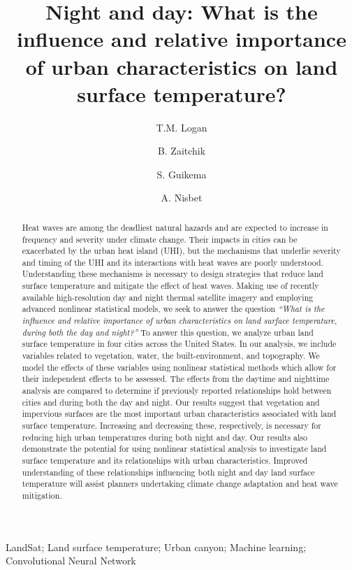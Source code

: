 \documentclass[final,3p,times,twocolumn,sort&compress]{elsarticle}
\begin{document}
\begin{frontmatter}

\title{Night and day: What is the influence and relative importance of urban characteristics on land surface temperature?}

\author[1]{T.M. Logan}

\author[2]{B. Zaitchik}
\author[1]{S. Guikema}
\author[]{A. Nisbet}

\address[1]{Industrial and Operations Engineering, University of Michigan, Ann Arbor, MI}
\address[2]{Earth and Planetary Sciences, Johns Hopkins University, Baltimore, MD}

\begin{abstract}
Heat waves are among the deadliest natural hazards and are expected to increase in frequency and severity under climate change. 
Their impacts in cities can be exacerbated by the urban heat island (UHI), but the mechanisms that underlie severity and timing of the UHI and its interactions with heat waves are poorly understood.
Understanding these mechanisms is necessary to design strategies that reduce land surface temperature and mitigate the effect of heat waves.
Making use of recently available high-resolution day and night thermal satellite imagery and employing advanced nonlinear statistical models, we seek to answer the question \textit{``What is the influence and relative importance of urban characteristics on land surface temperature, during both the day and night?''} 
To answer this question, we analyze urban land surface temperature in four cities across the United States.
In our analysis, we include variables related to vegetation, water, the built-environment, and topography. 
We model the effects of these variables using nonlinear statistical methods which allow for their independent effects to be assessed.
The effects from the daytime and nighttime analysis are compared to determine if previously reported relationships hold between cities and during both the day and night.
Our results suggest that vegetation and impervious surfaces are the most important urban characteristics associated with land surface temperature.
Increasing and decreasing these, respectively, is necessary for reducing high urban temperatures during both night and day.
Our results also demonstrate the potential for using nonlinear statistical analysis to investigate land surface temperature and its relationships with urban characteristics. 
Improved understanding of these relationships influencing both night and day land surface temperature will assist planners undertaking climate change adaptation and heat wave mitigation.
\end{abstract}

\begin{keyword}
LandSat; Land surface temperature; Urban canyon; Machine learning; Convolutional Neural Network
\end{keyword}

\end{frontmatter}
\end{document}
